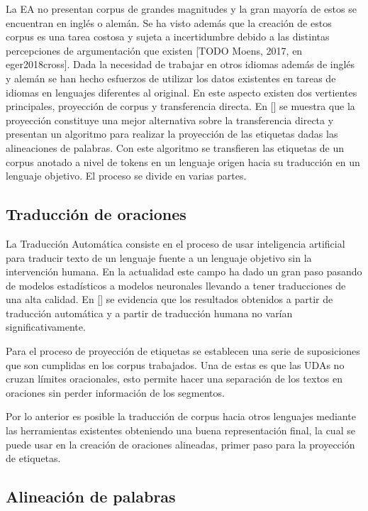 La EA no presentan corpus de grandes magnitudes y la gran mayoría de estos se encuentran en inglés o alemán. 
Se ha visto además que la creación de estos corpus es una tarea costosa y sujeta a incertidumbre debido a las
distintas percepciones de argumentación que existen [TODO Moens, 2017, en eger2018cross]. Dada la necesidad de trabajar en otros idiomas además de
inglés y alemán se han hecho esfuerzos de utilizar los datos existentes en tareas de idiomas en lenguajes 
diferentes al original. En este aspecto existen dos vertientes principales, proyección de corpus y transferencia
directa. En [\cite{eger2018cross}] se muestra que la proyección constituye una mejor alternativa sobre la transferencia
directa y presentan un algoritmo para realizar la proyección de las etiquetas dadas las alineaciones de palabras.
Con este algoritmo se transfieren las etiquetas de un corpus anotado a nivel de tokens en un lenguaje origen 
hacia su traducción en un lenguaje objetivo. El proceso se divide en varias partes.

\subsection{Traducción de oraciones}

La Traducción Automática consiste en el proceso de usar inteligencia artificial para
traducir texto de un lenguaje fuente a un lenguaje objetivo sin la intervención humana.
En la actualidad este campo ha dado un gran paso pasando de modelos estadísticos a modelos
neuronales llevando a tener traducciones de una alta calidad. En [\cite{eger2018cross}] se
evidencia que los resultados obtenidos a partir de traducción automática y a partir de 
traducción humana no varían significativamente. 

Para el proceso de proyección de etiquetas se establecen una serie de suposiciones que son
cumplidas en los corpus trabajados. Una de estas es que las UDAs no cruzan límites oracionales, esto
permite hacer una separación de los textos en oraciones sin perder información de los segmentos. 

Por lo anterior es posible la traducción de corpus hacia otros lenguajes mediante las
herramientas existentes obteniendo una buena representación final, la cual se puede usar en la creación de
oraciones alineadas, primer paso para la proyección de etiquetas.

\subsection{Alineación de palabras}

